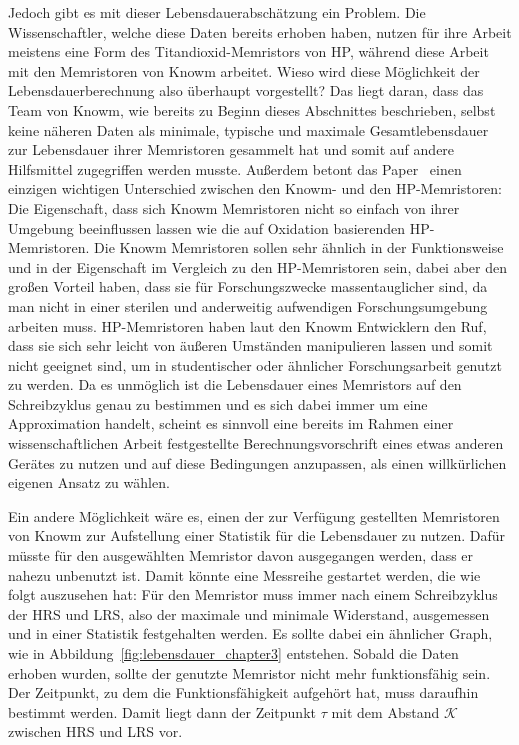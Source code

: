   Jedoch gibt es mit dieser Lebensdauerabschätzung ein Problem. Die Wissenschaftler, welche diese Daten bereits erhoben haben, nutzen für ihre Arbeit meistens eine Form des Titandioxid-Memristors von HP, während diese Arbeit mit den Memristoren von Knowm arbeitet. Wieso wird diese Möglichkeit der Lebensdauerberechnung also überhaupt vorgestellt? Das liegt daran, dass das Team von Knowm, wie bereits zu Beginn dieses Abschnittes beschrieben, selbst keine näheren Daten als minimale, typische und maximale Gesamtlebensdauer zur Lebensdauer ihrer Memristoren gesammelt hat und somit auf andere Hilfsmittel zugegriffen werden musste. Außerdem betont das Paper~\cite{knowm_comp_2015} einen einzigen wichtigen Unterschied zwischen den Knowm- und den HP-Memristoren: Die Eigenschaft, dass sich Knowm Memristoren nicht so einfach von ihrer Umgebung beeinflussen lassen wie die auf Oxidation basierenden HP-Memristoren. Die Knowm Memristoren sollen sehr ähnlich in der Funktionsweise und in der Eigenschaft im Vergleich zu den HP-Memristoren sein, dabei aber den großen Vorteil haben, dass sie für Forschungszwecke massentauglicher sind, da man nicht in einer sterilen und anderweitig aufwendigen Forschungsumgebung arbeiten muss. HP-Memristoren haben laut den Knowm Entwicklern den Ruf, dass sie sich sehr leicht von äußeren Umständen manipulieren lassen und somit nicht geeignet sind, um in studentischer oder ähnlicher Forschungsarbeit genutzt zu werden. Da es unmöglich ist die Lebensdauer eines Memristors auf den Schreibzyklus genau zu bestimmen und es sich dabei immer um eine Approximation  handelt, scheint es sinnvoll eine bereits im Rahmen einer wissenschaftlichen Arbeit festgestellte Berechnungsvorschrift eines etwas anderen Gerätes zu nutzen und auf diese Bedingungen anzupassen, als einen willkürlichen eigenen Ansatz zu wählen.

  Ein andere Möglichkeit wäre es, einen der zur Verfügung gestellten Memristoren von Knowm zur Aufstellung einer Statistik für die Lebensdauer zu nutzen. Dafür müsste für den ausgewählten Memristor davon ausgegangen werden, dass er nahezu unbenutzt ist. Damit könnte eine Messreihe gestartet werden, die wie folgt auszusehen hat: Für den Memristor muss immer nach einem Schreibzyklus der HRS und LRS, also der maximale und minimale Widerstand, ausgemessen und in einer Statistik festgehalten werden. Es sollte dabei ein ähnlicher Graph, wie in Abbildung~\ref{fig:lebensdauer_chapter3} entstehen. Sobald die Daten erhoben wurden, sollte der genutzte Memristor nicht mehr funktionsfähig sein. Der Zeitpunkt, zu dem die Funktionsfähigkeit aufgehört hat, muss daraufhin bestimmt werden. Damit liegt dann der Zeitpunkt $\tau$ mit dem Abstand $\mathcal{K}$ zwischen HRS und LRS vor.

